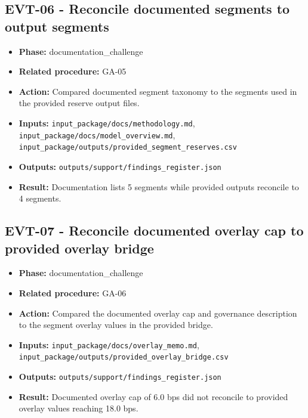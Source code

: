 \documentclass[11pt]{article}
\begin{document}
\subsection*{EVT-06 - Reconcile documented segments to output segments}
\begin{itemize}
\item \textbf{Phase:} documentation\_challenge
\item \textbf{Related procedure:} GA-05
\item \textbf{Action:} Compared documented segment taxonomy to the segments used in the provided reserve output files.
\item \textbf{Inputs:} \texttt{input\_package/docs/methodology.md}, \texttt{input\_package/docs/model\_overview.md}, \texttt{input\_package/outputs/provided\_segment\_reserves.csv}
\item \textbf{Outputs:} \texttt{outputs/support/findings\_register.json}
\item \textbf{Result:} Documentation lists 5 segments while provided outputs reconcile to 4 segments.
\end{itemize}
\subsection*{EVT-07 - Reconcile documented overlay cap to provided overlay bridge}
\begin{itemize}
\item \textbf{Phase:} documentation\_challenge
\item \textbf{Related procedure:} GA-06
\item \textbf{Action:} Compared the documented overlay cap and governance description to the segment overlay values in the provided bridge.
\item \textbf{Inputs:} \texttt{input\_package/docs/overlay\_memo.md}, \texttt{input\_package/outputs/provided\_overlay\_bridge.csv}
\item \textbf{Outputs:} \texttt{outputs/support/findings\_register.json}
\item \textbf{Result:} Documented overlay cap of 6.0 bps did not reconcile to provided overlay values reaching 18.0 bps.
\end{itemize}
\end{document}
